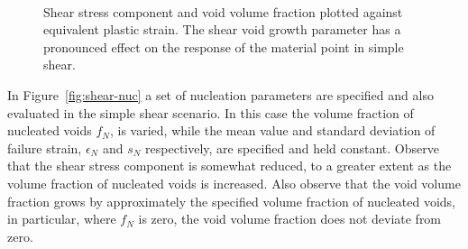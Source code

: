 \begin{figure}[htbp]
  \begin{center}
    ~ 
    \caption{Shear stress component and void volume fraction plotted
      against equivalent plastic strain. The shear void growth
      parameter has a pronounced effect on the response of the
      material point in simple shear.}
    \label{fig:shear-kw}
  \end{center}
\end{figure}

In Figure~\ref{fig:shear-nuc} a set of nucleation parameters are
specified and also evaluated in the simple shear scenario. In this
case the volume fraction of nucleated voids $f_{N}$, is varied, while
the mean value and standard deviation of failure strain, $\epsilon_N$
and $s_N$ respectively, are specified and held constant. Observe that
the shear stress component is somewhat reduced, to a greater extent as
the volume fraction of nucleated voids is increased. Also observe that
the void volume fraction grows by approximately the specified volume
fraction of nucleated voids, in particular, where $f_{N}$ is zero, the
void volume fraction does not deviate from zero.


